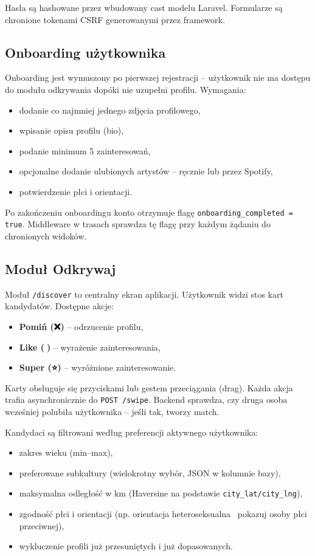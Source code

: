 \documentclass[12pt,a4paper]{article}
\begin{document}
Hasła są hashowane przez wbudowany cast modelu Laravel. Formularze są chronione tokenami CSRF generowanymi przez framework.

\subsection{Onboarding użytkownika}

Onboarding jest wymuszony po pierwszej rejestracji -- użytkownik nie ma dostępu do modułu odkrywania dopóki nie uzupełni profilu. Wymagania:
\begin{itemize}
    \item dodanie co najmniej jednego zdjęcia profilowego,
    \item wpisanie opisu profilu (bio),
    \item podanie minimum 5 zainteresowań,
    \item opcjonalne dodanie ulubionych artystów -- ręcznie lub przez Spotify,
    \item potwierdzenie płci i orientacji.
\end{itemize}

Po zakończeniu onboardingu konto otrzymuje flagę \texttt{onboarding\_completed = true}. Middleware w trasach sprawdza tę flagę przy każdym żądaniu do chronionych widoków.

\subsection{Moduł Odkrywaj}

Moduł \texttt{/discover} to centralny ekran aplikacji. Użytkownik widzi stos kart kandydatów. Dostępne akcje:
\begin{itemize}
    \item \textbf{Pomiń (❌)} -- odrzucenie profilu,
    \item \textbf{Like (💚)} -- wyrażenie zainteresowania,
    \item \textbf{Super (⭐)} -- wyróżnione zainteresowanie.
\end{itemize}

Karty obsługuje się przyciskami lub gestem przeciągania (drag). Każda akcja trafia asynchronicznie do \texttt{POST /swipe}. Backend sprawdza, czy druga osoba wcześniej polubiła użytkownika -- jeśli tak, tworzy match.

Kandydaci są filtrowani według preferencji aktywnego użytkownika:
\begin{itemize}
    \item zakres wieku (min–max),
    \item preferowane subkultury (wielokrotny wybór, JSON w kolumnie bazy),
    \item maksymalna odległość w km (Haversine na podstawie \texttt{city\_lat/city\_lng}),
    \item zgodność płci i orientacji (np. orientacja heteroseksualna \textrightarrow\ pokazuj osoby płci przeciwnej),
    \item wykluczenie profili już przesuniętych i już dopasowanych.
\end{itemize}
\end{document}
